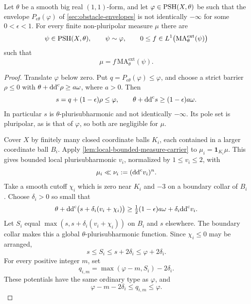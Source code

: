 \begin{proposition}\label{prop:relative-measure-carrier}
Let $\theta$ be a smooth big real $(1,1)$-form, and let $\varphi\in\mathrm{PSH}(X,\theta)$ be such that the envelope $P_{\epsilon\theta}(\varphi)$ of \cref{sec:obstacle-envelopes} is not identically $-\infty$ for some $0<\epsilon<1$. For every finite non-pluripolar measure $\mu$ there are
\[
 \psi\in\mathrm{PSH}(X,\theta),\qquad\psi\sim\varphi,
 \qquad 0\leq f\in L^1\bigl(\mathrm{MA}^{\mathrm{ext}}_\theta(\psi)\bigr)
\]
such that
\[
 \mu=f\,\mathrm{MA}^{\mathrm{ext}}_\theta(\psi).
\]
\end{proposition}
\begin{proof}
Translate $\varphi$ below zero. Put $q=P_{\epsilon\theta}(\varphi)\leq\varphi$, and choose a strict barrier $\rho\leq0$ with $\theta+\mathrm{dd}^{\mathrm{c}}\rho\geq a\omega$, where $a>0$. Then
\[
 s=q+(1-\epsilon)\rho\leq\varphi,\qquad
 \theta+\mathrm{dd}^{\mathrm{c}} s\geq(1-\epsilon)a\omega.
\]
In particular $s$ is $\theta$-plurisubharmonic and not identically $-\infty$. Its pole set is pluripolar, as is that of $\varphi$, so both are negligible for $\mu$.

Cover $X$ by finitely many closed coordinate balls $K_i$, each contained in a larger coordinate ball $B_i$. Apply \cref{lem:local-bounded-measure-carrier} to $\mu_i=\mathbf1_{K_i}\mu$. This gives bounded local plurisubharmonic $v_i$, normalized by $1\leq v_i\leq2$, with
\[
 \mu_i\ll\nu_i:=(\mathrm{dd}^{\mathrm{c}} v_i)^n.
\]
Take a smooth cutoff $\chi_i$ which is zero near $K_i$ and $-3$ on a boundary collar of $B_i$. Choose $\delta_i>0$ so small that
\[
 \theta+\mathrm{dd}^{\mathrm{c}}\bigl(s+\delta_i(v_i+\chi_i)\bigr)
 \geq\tfrac12(1-\epsilon)a\omega+\delta_i\mathrm{dd}^{\mathrm{c}} v_i.
\]
Let $S_i$ equal $\max(s,s+\delta_i(v_i+\chi_i))$ on $B_i$ and $s$ elsewhere. The boundary collar makes this a global $\theta$-plurisubharmonic function. Since $\chi_i\leq0$ may be arranged,
\[
 s\leq S_i\leq s+2\delta_i\leq\varphi+2\delta_i.
\]
For every positive integer $m$, set
\[
 q_{i,m}=\max(\varphi-m,S_i)-2\delta_i.
\]
These potentials have the same ordinary type as $\varphi$, and
\begin{equation}\label{eq:relative-carrier-bounds}
 \varphi-m-2\delta_i\leq q_{i,m}\leq\varphi.
\end{equation}


\end{proof}

